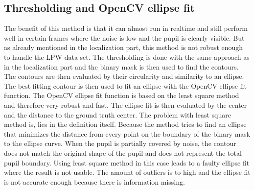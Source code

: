 \subsection{Thresholding and OpenCV ellipse fit}
\label{}
The benefit of this method is that it can almost run in realtime and still perform well in certain frames where the noise is low and the pupil is clearly visible. But as already mentioned in the localization part, this method is not robust enough to handle the LPW data set. The thresholding is done with the same approach as in the localization part and the binary mask is then used to find the contours. The contours are then evaluated by their circularity and similarity to an ellipse. The best fitting contour is then used to fit an ellipse with the OpenCV ellipse fit function. The OpenCV ellipse fit function is based on the least square method and therefore very robust and fast. The ellipse fit is then evaluated by the center and the distance to the ground truth center. The problem with least square method is, lies in the definition itself. Because the method tries to find an ellipse that minimizes the distance from every point on the boundary of the binary mask to the ellipse curve. When the pupil is partially covered by noise, the contour does not match the original shape of the pupil and does not represent the total pupil boundary. Using least square method in this case leads to a faulty ellipse fit where the result is not usable. The amount of outliers is to high and the ellipse fit is not accurate enough because there is information missing. 
